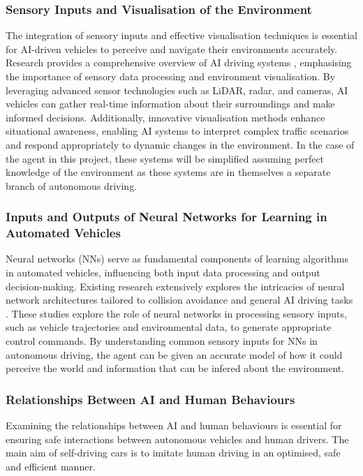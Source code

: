 \documentclass{article}
\begin{document}
\subsubsection{Sensory Inputs and Visualisation of the Environment}
The integration of sensory inputs and effective visualisation techniques is essential for AI-driven vehicles to perceive and navigate their environments accurately. Research provides a comprehensive overview of AI driving systems \cite{General-overview-of-ai-driving}, emphasising the importance of sensory data processing and environment visualisation. By leveraging advanced sensor technologies such as LiDAR, radar, and cameras, AI vehicles can gather real-time information about their surroundings and make informed decisions. Additionally, innovative visualisation methods enhance situational awareness, enabling AI systems to interpret complex traffic scenarios and respond appropriately to dynamic changes in the environment. In the case of the agent in this project, these systems will be simplified assuming perfect knowledge of the environment as these systems are in themselves a separate branch of autonomous driving.

\subsubsection{Inputs and Outputs of Neural Networks for Learning in Automated Vehicles}
Neural networks (NNs) serve as fundamental components of learning algorithms in automated vehicles, influencing both input data processing and output decision-making. Existing research extensively explores the intricacies of neural network architectures tailored to collision avoidance and general AI driving tasks \cite{Deep-RL-for-AI-driving-general-overview}. These studies explore the role of neural networks in processing sensory inputs, such as vehicle trajectories and environmental data, to generate appropriate control commands. By understanding common sensory inputs for NNs in autonomous driving, the agent can be given an accurate model of how it could perceive the world and information that can be infered about the environment.

\subsubsection{Relationships Between AI and Human Behaviours}
\cite{Predictive-reward-function-for-ai-driving}
Examining the relationships between AI and human behaviours is essential for ensuring safe interactions between autonomous vehicles and human drivers. The main aim of self-driving cars is to imitate human driving in an optimised, safe and efficient manner.
\end{document}
